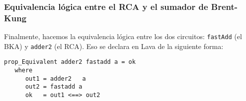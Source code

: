 \subsubsection{Equivalencia lógica entre el RCA y el sumador de Brent-Kung}
Finalmente, hacemos la equivalencia lógica entre los dos circuitos: {\footnotesize\verb|fastAdd|} (el BKA) y {\footnotesize\verb|adder2|} (el RCA). Eso se declara en Lava de la siguiente forma:
{\footnotesize
\begin{verbatim}
prop_Equivalent adder2 fastadd a = ok
   where
      out1 = adder2   a
      out2 = fastadd a
      ok   = out1 <==> out2
\end{verbatim}
}

